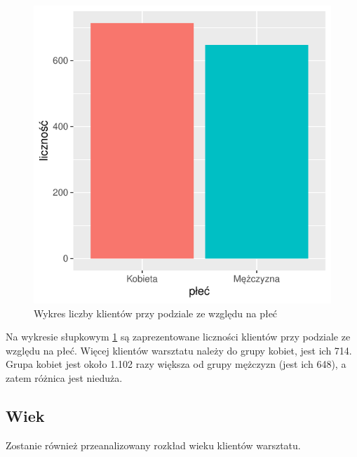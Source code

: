 \documentclass{article}\usepackage[]{graphicx}\usepackage[]{xcolor}
\makeatletter
\def\maxwidth{ %
  \ifdim\Gin@nat@width>\linewidth
    \linewidth
  \else
    \Gin@nat@width
  \fi
}
\newenvironment{knitrout}{}{} %
\makeatother
\begin{document}
\begin{knitrout}
\color{fgcolor}\begin{figure}[H]

{\centering \includegraphics[width=\maxwidth]{figure/fig_plec-1} 

}

\caption[Wykres liczby klientów przy podziale ze względu na płeć]{Wykres liczby klientów przy podziale ze względu na płeć}\label{fig:fig_plec}
\end{figure}

\end{knitrout}

Na wykresie słupkowym \ref{fig:fig_plec} są zaprezentowane liczności klientów przy podziale ze względu na płeć. Więcej klientów warsztatu należy do grupy kobiet, jest ich 714. Grupa kobiet jest około 1.102
razy większa od grupy mężczyzn (jest ich 648), a zatem różnica jest nieduża.

\subsection{Wiek}

Zostanie również przeanalizowany rozkład wieku klientów warsztatu.
\end{document}
